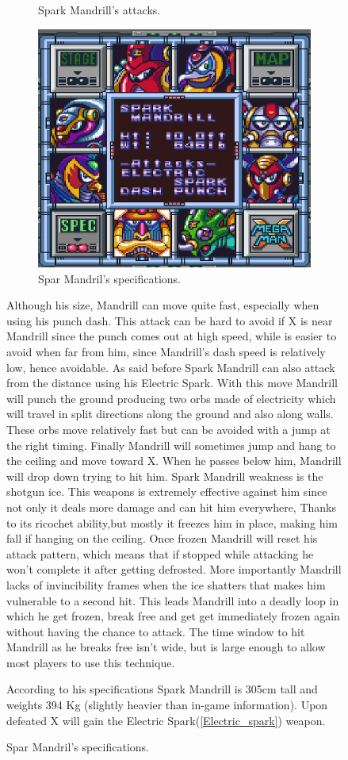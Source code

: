 \begin{figure}[htp]
\begin{figure}[htp]
\begin{subfigure}[t]{0.4\linewidth}
	\end{subfigure}
	\caption{Spark Mandrill's attacks.}
\end{figure}
\begin{figure}[htp]
	\centering
	\includegraphics[width=0.4\linewidth]{figures/X1/Spark_mandrill/Spark_mandril_specs.png}
	\caption{Spar Mandril's specifications.}
\end{figure}
Although his size, Mandrill can move quite fast, especially when using his punch dash. This attack can be hard to avoid if X is near Mandrill since the punch comes out at high speed, while is easier to avoid when far from him, since Mandrill's dash speed is relatively low, hence avoidable.  As said before Spark Mandrill can also attack from the distance using his Electric Spark. With this move Mandrill will punch the ground producing two orbs made of electricity which will travel in split directions along the ground and also along walls. These orbs move relatively fast but can be avoided with a jump at the right timing. Finally Mandrill will sometimes jump and hang to the ceiling and move toward X. When he passes below him, Mandrill will drop down trying to hit him.
Spark Mandrill weakness is the shotgun ice. This weapons is extremely effective against him since not only it deals more damage and can hit him everywhere, Thanks to its ricochet ability,but mostly it freezes him in place, making him fall if hanging on the ceiling. Once frozen Mandrill will reset his attack pattern, which means that if stopped while attacking he won't complete it after getting defrosted. More importantly Mandrill lacks of invincibility frames when the ice shatters that makes him vulnerable to a second hit. This leads Mandrill into a deadly loop in which he get frozen, break free and get get immediately frozen again without having the chance to attack. The time window to hit Mandrill as he breaks free isn't wide, but is large enough to allow most players to use this technique. 

According to his specifications Spark Mandrill is 305cm tall and weights 394 Kg (slightly heavier than in-game information). Upon defeated X will gain the Electric Spark(\ref{Electric_spark}) weapon.




\end{figure}
